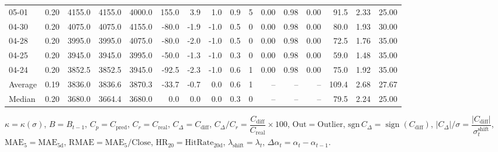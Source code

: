 \begin{threeparttable}
{\begin{tabular}{lrrrrrrrrrrrrrrr}
  05-01 &     0.20 & 4155.0 & 4155.0 & 4000.0 &      155.0 &            3.9 &                      1.0 &                 0.9 &              5 &       0.00 &      0.98 &           0.00 &             91.5 &            2.33 &                  25.00 \\
  04-30 &     0.20 & 4075.0 & 4075.0 & 4155.0 &      -80.0 &           -1.9 &                     -1.0 &                 0.5 &              0 &       0.00 &      0.98 &           0.00 &             80.0 &            1.93 &                  30.00 \\
  04-28 &     0.20 & 3995.0 & 3995.0 & 4075.0 &      -80.0 &           -2.0 &                     -1.0 &                 0.5 &              0 &       0.00 &      0.98 &           0.00 &             72.5 &            1.76 &                  35.00 \\
  04-25 &     0.20 & 3945.0 & 3945.0 & 3995.0 &      -50.0 &           -1.3 &                     -1.0 &                 0.3 &              0 &       0.00 &      0.98 &           0.00 &             59.0 &            1.48 &                  35.00 \\
  04-24 &     0.20 & 3852.5 & 3852.5 & 3945.0 &      -92.5 &           -2.3 &                     -1.0 &                 0.6 &              1 &       0.00 &      0.98 &           0.00 &             75.0 &            1.92 &                  35.00 \\
Average &     0.19 & 3836.0 & 3836.6 & 3870.3 &      -33.7 &           -0.7 &                      0.0 &                 0.6 &              1 &         -- &        -- &             -- &            109.4 &            2.68 &                  27.67 \\
 Median &     0.20 & 3680.0 & 3664.4 & 3680.0 &        0.0 &            0.0 &                      0.0 &                 0.3 &              0 &         -- &        -- &             -- &             79.5 &            2.24 &                  25.00 \\
\bottomrule
\end{tabular}
}
\begin{tablenotes}\footnotesize
\item $\kappa=\kappa(\sigma)$, $B=B_{t-1}$, $C_p=C_{\text{pred}}$, $C_r=C_{\text{real}}$, $C_\Delta=C_{\text{diff}}$, $C_\Delta/C_r=\dfrac{C_{\text{diff}}}{C_{\text{real}}}\times100$, $\mathrm{Out}=\text{Outlier}$, $\mathrm{sgn}\,C_\Delta=\operatorname{sign}(C_{\text{diff}})$, $|C_\Delta|/\sigma=\dfrac{|C_{\text{diff}}|}{\sigma_t^{\text{shift}}}$, $\mathrm{MAE}_5=\mathrm{MAE}_{5\text{d}}$, $\mathrm{RMAE}= \mathrm{MAE}_5 / \text{Close}$, $\mathrm{HR}_{20}=\mathrm{HitRate}_{20\text{d}}$, 
$\lambda_{\text{shift}}=\lambda_t$, 
$\Delta\alpha_t=\alpha_t-\alpha_{t-1}$.
\end{tablenotes}
\end{threeparttable}
\endgroup

